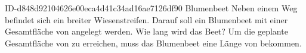 \begin{exercise}
      {ID-d848d92104626e00eca4d41c34ad16ae7126df90}
      {Blumenbeet}
  \ifproblem\problem
    Neben einem Weg befindet sich ein  breiter Wiesenstreifen. Darauf
    soll ein Blumenbeet mit einer Gesamtfläche von  angelegt werden.
    Wie lang wird das Beet?
  \fi
  \ifoutcome\outcome
    Um die geplante Gesamtfläche von  zu erreichen, muss
    das Blumenbeet eine Länge von  bekommen.
  \fi
\end{exercise}
